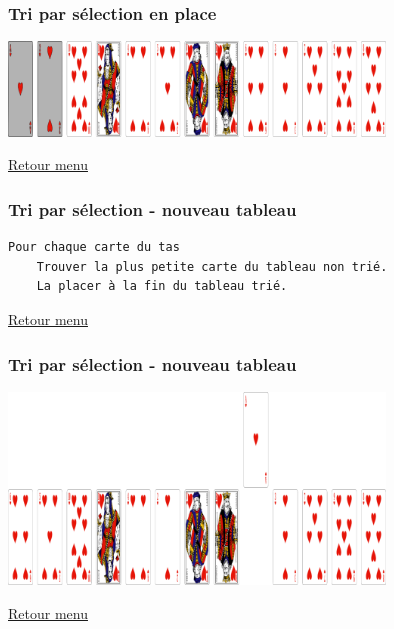 \documentclass[svgnames,11pt]{beamer}
\begin{document}
\begin{frame}
    \frametitle{Tri par sélection en place}

    \begin{center}
        \centering
        \includegraphics[width=10cm]{ressources/selection-2-4.png}
        \label{pique}
    \end{center}
    \hyperlink{menu}{Retour menu}

\end{frame}


\begin{frame}[fragile]
    \frametitle{\hypertarget{selection2}{Tri par sélection - nouveau tableau}
    }
    \begin{center}
        \begin{lstlisting}[language=bash, basicstyle=\small, xrightmargin=1em]
Pour chaque carte du tas
    Trouver la plus petite carte du tableau non trié.
    La placer à la fin du tableau trié.
        \end{lstlisting}
        \label{CODE}
    \end{center}
\hyperlink{menu}{Retour menu}
\end{frame}
\begin{frame}
    \frametitle{Tri par sélection - nouveau tableau}

    \begin{center}
        \centering
        \includegraphics[width=10cm]{ressources/selection2-1.png}
        \label{pique}
    \end{center}
    \hyperlink{menu}{Retour menu}

\end{frame}
\end{document}
